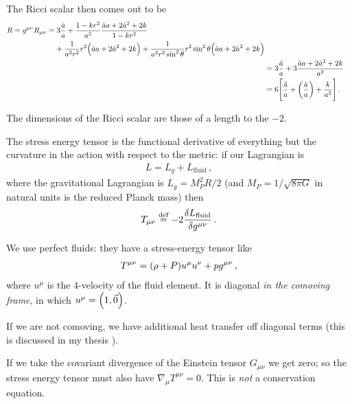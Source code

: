 \documentclass[main.tex]{subfiles}
\begin{document}
The Ricci scalar then comes out to be 
%
\begin{align}
\begin{split}
R = g^{\mu \nu } R_{\mu \nu } 
&= 3 \frac{\ddot{a}}{a} 
+ \frac{1-kr^2}{a^2} \frac{\ddot{a}
 a + 2 \dot{a}^2 + 2k}{1 - kr^2} \\
 &\phantom{=}\ 
+ \frac{1}{a^2r^2} r^2 \qty(\ddot{a} a + 2 \dot{a}^2 + 2k)
+ \frac{1}{a^2r^2 \sin^2\theta }
r^2 \sin^2\theta  \qty(\ddot{a} a + 2 \dot{a}^2 + 2k) 
\end{split}
\\
&= 3 \frac{\ddot{a}}{a} + 3 \frac{\ddot{a}a + 2 \dot{a}^2 + 2k}{a^2}
\\
&= 6 \qty[\frac{\ddot{a}}{a} + \qty(\frac{\dot{a}}{a}) + \frac{k}{a^2}]
\,.
\end{align}

The dimensions of the Ricci scalar are those of a length to the \(-2\). 

The stress energy tensor is the functional derivative of everything but the curvature in the action with respect to the metric: if our Lagrangian is 
%
\begin{align}
L = L_{g} + L_{\text{fluid}}
\,,
\end{align}
%
where the gravitational Lagrangian is \(L_{g} = M_P^2 R /2 \) (and \(M_P = 1 / \sqrt{8 \pi G}\) in natural units is the reduced Planck mass) then 
%
\begin{align}
T_{\mu \nu } \overset{\text{def}}{=} -2 \fdv{L_{\text{fluid}}}{g^{\mu \nu }}
\,.
\end{align}


We use perfect fluids: they have a stress-energy tensor like 
%
\begin{align}
T^{\mu \nu } =  \qty(\rho + P) u^{\mu } u^{\nu } + p g^{\mu \nu }
\,,
\end{align}
%
where \(u^{\mu }\) is the 4-velocity of the fluid element. 
It is diagonal \emph{in the comoving frame}, in which \(u^{\mu } = \qty(1, \vec{0})\).

If we are not comoving, we have additional heat transfer off diagonal terms (this is discussed in my thesis \cite[section 4.2]{tissinoRelativisticNonidealFlows2019}). 

If we take the covariant divergence of the Einstein tensor \(G_{\mu \nu }\) we get zero; so the stress energy tensor must also have \(\nabla_{\mu} T^{\mu \nu }=0\). 
This is \emph{not} a conservation equation. 
\end{document}
